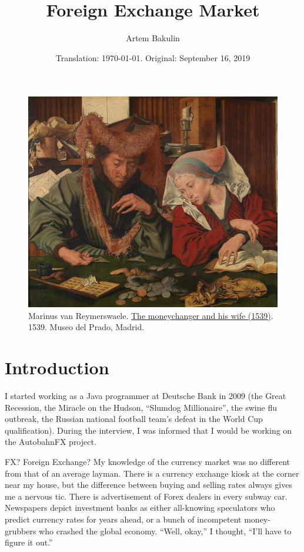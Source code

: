 \documentclass[a4paper,14pt]{extarticle}
\author{Artem Bakulin}
\date{Translation: \today. Original: September 16, 2019}
\title{Foreign Exchange Market}
\begin{document}
\maketitle
\thispagestyle{empty}

\begin{figure}[h]
\centering
\includegraphics[width=\textwidth]{../moneychanger_and_his_wife.jpg}
\captionsetup{labelformat=empty}
\caption{\small{
Marinus van Reymerswaele. \href{https://commons.wikimedia.org/wiki/File:Marinus_Claesz._van_Reymerswaele_001.jpg}{The moneychanger and his wife (1539)}. 1539. Museo del Prado, Madrid.
}}
\end{figure}
\newpage

\section*{Introduction}

I started working as a Java programmer at Deutsche Bank in 2009 (the
Great Recession, the Miracle on the Hudson, ``Slumdog Millionaire'', the swine 
flu outbreak, the Russian national football team's defeat in the World Cup 
qualification). During the interview, I was informed that I would be working on 
the AutobahnFX project.

FX? Foreign Exchange? My knowledge of the currency market was no different from 
that of an average layman. There is a currency exchange kiosk at the corner near 
my house, but the difference between buying and selling rates always gives me
a nervous tic. There is advertisement of Forex dealers in every subway car. 
Newspapers depict investment banks as either all-knowing speculators who 
predict currency rates for years ahead, or a bunch of incompetent money-grubbers 
who crashed the global economy. ``Well, okay,'' I thought, ``I'll have to figure 
it out.''
\end{document}
